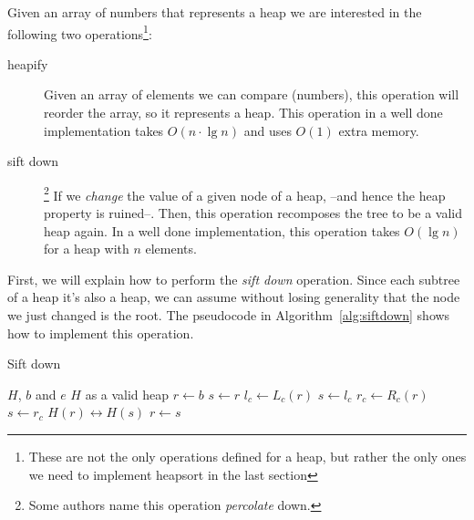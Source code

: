 Given an array of numbers that represents a heap we are interested in the following two operations\footnote{These are not the only operations defined for a heap, but rather the only ones we need to implement heapsort in the last section}:

\begin{description}
 \item[heapify] Given an array of elements we can compare (numbers), this operation will reorder the array, so it represents a heap. This operation in a well done implementation takes $O(n \cdot \lg n)$ and uses $O(1)$ extra memory.
 \item[sift down]\footnote{Some authors name this operation \emph{percolate} down.} If we \emph{change} the value of a given node of a heap, --and hence the heap property is ruined--. Then, this operation recomposes the tree to be a valid heap again. In a well done implementation, this operation takes $O(\lg n)$ for a heap with $n$ elements.
\end{description}

First, we will explain how to perform the \emph{sift down} operation.
Since each subtree of a heap it's also a heap, we can assume without losing generality that the node we just changed is the root.
The pseudocode in Algorithm~\ref{alg:siftdown} shows how to implement this operation.

\begin{algorithm}[H]
\caption{Sift down}
\label{alg:siftdown}
\begin{algorithmic}[1] %
\Require $H$, $b$ and $e$ 
\Ensure $H$ as a valid heap
 
\State $r \gets b$ 
 
    \State $s \gets r$ 
    \State $l_c \gets L_c(r)$ 
     
        \State $s \gets l_c$ 
    \EndIf
    \State $r_c \gets R_c(r)$ 
     
        \State $s \gets r_c$ 
    \EndIf
     
        \State \Return {}
    \Else
        \State $H(r) \leftrightarrow H(s)$ 
        \State $r \gets s$ 
    \EndIf
\EndWhile
\EndProcedure
\end{algorithmic}
\end{algorithm}

